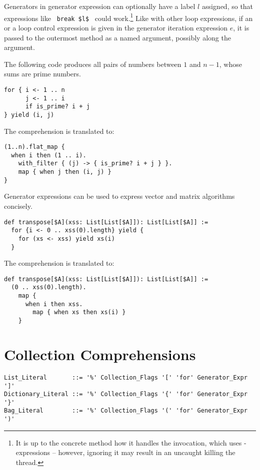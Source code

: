 Generators in generator expression can optionally have a label $l$ assigned, so that expressions like ~\lstinline!break $l$!~ could work.\footnote{It is up to the concrete method how it handles the invocation, which uses - expressions -- however, ignoring it may result in an uncaught  killing the thread.} Like with other loop expressions, if an  or a  loop control expression is given in the generator iteration expression $e$, it is passed to the outermost  method as a named argument, possibly along the  argument. 

\example The following code produces all pairs of numbers between $1$ and $n - 1$, whose sums are prime numbers. 
\begin{lstlisting}
for { i <- 1 .. n
      j <- 1 .. i
      if is_prime? i + j
} yield (i, j)
\end{lstlisting}
The comprehension is translated to:
\begin{lstlisting}
(1..n).flat_map {
  when i then (1 .. i).
    with_filter { (j) -> { is_prime? i + j } }.
    map { when j then (i, j) }
}
\end{lstlisting}

\example Generator expressions can be used to express vector and matrix algorithms concisely.
\begin{lstlisting}[mathescape=false]
def transpose[$A](xss: List[List[$A]]): List[List[$A]] :=
  for {i <- 0 .. xss(0).length} yield {
    for (xs <- xss) yield xs(i)
  }
\end{lstlisting} 
The comprehension is translated to: 
\begin{lstlisting}[mathescape=false]
def transpose[$A](xss: List[List[$A]]): List[List[$A]] := 
  (0 .. xss(0).length).
    map { 
      when i then xss.
        map { when xs then xs(i) }
    }
\end{lstlisting}






\section{Collection Comprehensions}

\syntax\begin{lstlisting}
List_Literal       ::= '%' Collection_Flags '[' 'for' Generator_Expr ']'
Dictionary_Literal ::= '%' Collection_Flags '{' 'for' Generator_Expr '}'
Bag_Literal        ::= '%' Collection_Flags '(' 'for' Generator_Expr ')'
\end{lstlisting}

